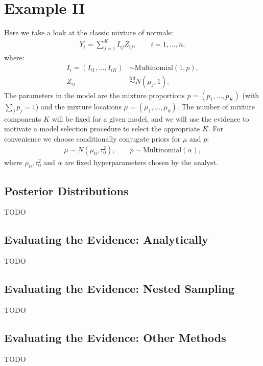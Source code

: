 \documentclass[11pt]{article}
\newcommand{\iid}{\stackrel{iid}{\sim}}
\begin{document}
\section{Example II}
Here we take a look at the classic mixture of normals:
\begin{align*}
 Y_{i} = \sum_{j=1}^{K}I_{ij}Z_{ij} , \qquad i=1,\ldots,n , 
\end{align*}
where:
\begin{align*}
 I_{i} = (I_{i1},\ldots,I_{iK}) &\sim \textrm{Multinomial}\left(1,p\right) , \\ 
 Z_{ij} &\iid N\left(\mu_{j},1\right) .
\end{align*}
The parameters in the model are the mixture proportions $p=(p_{1},\ldots,p_{K})$ (with $\sum_{j}p_{j}=1$) and the mixture locations $\mu=(\mu_{1},\ldots,\mu_{k})$. The number of mixture components $K$ will be fixed for a given model, and we will use the evidence to motivate a model selection procedure to select the appropriate $K$. For convenience we choose conditionally conjugate priors for $\mu$ and $p$:
\begin{align*}
 \mu \sim N\left(\mu_{0},\tau_{0}^{2}\right) , \qquad p \sim \textrm{Multinomial}\left(\alpha\right) ,
\end{align*}
where $\mu_{0}, \tau_{0}^{2}$ and $\alpha$ are fixed hyperparameters chosen by the analyst.

\subsection{Posterior Distributions}

TODO

\subsection{Evaluating the Evidence: Analytically}

TODO

\subsection{Evaluating the Evidence: Nested Sampling}

TODO

\subsection{Evaluating the Evidence: Other Methods}

TODO
\end{document}
